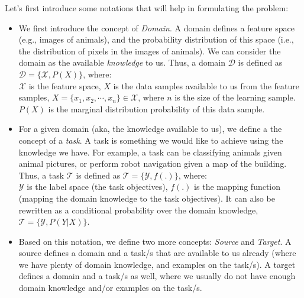 
  \par Let's first introduce some notations that will help in formulating the problem:
  \begin{itemize}
      \item We first introduce the concept of \textit{Domain}. A domain defines a feature space (e.g., images of animals), and the probability distribution of this space (i.e., the distribution of pixels in the images of animals). We can consider the domain as the available \textit{knowledge} to us. Thus, a domain $\mathcal{D}$ is defined as $\mathcal{D} = \{\mathcal{X}, P(X)\}$, where:\\
      $\mathcal{X}$ is the feature space, $X$ is the data samples available to us from the feature samples, $X = \{x_1,x_2,\cdots,x_n\} \in \mathcal{X}$, where $n$ is the size of the learning sample. $P(X)$ is the marginal distribution probability of this data sample.

      \item For a given domain (aka, the knowledge available to us), we define a the concept of a \textit{task}. A task is something we would like to achieve using the knowledge we have. For example, a task can be classifying animals given animal pictures, or perform robot navigation given a map of the building. Thus, a task $\mathcal{T}$ is defined as $\mathcal{T} = \{\mathcal{Y}, f(.)\}$, where:\\
      $\mathcal{Y}$ is the label space (the task objectives), $f(.)$ is the mapping function (mapping the domain knowledge to the task objectives). It can also be rewritten as a conditional probability over the domain knowledge, $\mathcal{T} = \{\mathcal{Y}, P(Y|X)\}$.

      \item Based on this notation, we define two more concepts: \textit{Source} and \textit{Target}. A source defines a domain and a task/s that are available to us already (where we have plenty of domain knowledge, and examples on the task/s). A target defines a domain and a task/s as well, where we usually do not have enough domain knowledge and/or examples on the task/s.
  \end{itemize}

